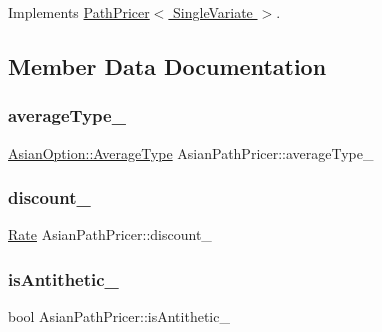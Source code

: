 Implements \hyperlink{class_path_pricer_a14b2a03f259bb56a24a66c9b95bdcf67}{Path\+Pricer$<$ Single\+Variate $>$}.



\subsection{Member Data Documentation}
\hypertarget{class_asian_path_pricer_a28ff57b497033627d84ffa2273b6613e}{}\label{class_asian_path_pricer_a28ff57b497033627d84ffa2273b6613e} 
\subsubsection{\texorpdfstring{average\+Type\+\_\+}{averageType\_}}
{\footnotesize\ttfamily \hyperlink{class_asian_option_add7292791bf85820ff9fdbfd4407f3b9}{Asian\+Option\+::\+Average\+Type} Asian\+Path\+Pricer\+::average\+Type\+\_\+\hspace{0.3cm}{\ttfamily [private]}}

\hypertarget{class_asian_path_pricer_a3b8dfce72f9ec0d56c116b7b27e8504f}{}\label{class_asian_path_pricer_a3b8dfce72f9ec0d56c116b7b27e8504f} 
\subsubsection{\texorpdfstring{discount\+\_\+}{discount\_}}
{\footnotesize\ttfamily \hyperlink{_name_def_8h_a25bee43a162de339c81f3d1caf6b887d}{Rate} Asian\+Path\+Pricer\+::discount\+\_\+\hspace{0.3cm}{\ttfamily [private]}}

\hypertarget{class_asian_path_pricer_ad42c5d8d3b3d1c66d01620491c07bef6}{}\label{class_asian_path_pricer_ad42c5d8d3b3d1c66d01620491c07bef6} 
\subsubsection{\texorpdfstring{is\+Antithetic\+\_\+}{isAntithetic\_}}
{\footnotesize\ttfamily bool Asian\+Path\+Pricer\+::is\+Antithetic\+\_\+\hspace{0.3cm}{\ttfamily [private]}}


